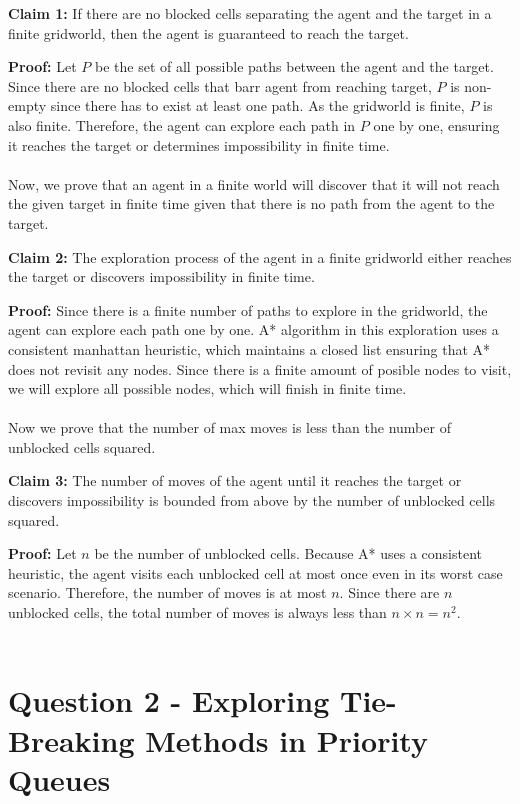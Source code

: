 \documentclass{article}
\begin{document}
\textbf{Claim 1:} If there are no blocked cells separating the agent and the target in a finite gridworld, then the agent is guaranteed to reach the target.

\textbf{Proof:} Let $P$ be the set of all possible paths between the agent and the target. Since there are no blocked cells that barr agent from reaching target, $P$ is non-empty since there has to exist at least one path. As the gridworld is finite, $P$ is also finite. Therefore, the agent can explore each path in $P$ one by one, ensuring it reaches the target or determines impossibility in finite time.
\\
\\
Now, we prove that an agent in a finite world will discover that it will not reach the given target in finite time given that there is no path from the agent to the target.

\textbf{Claim 2:} The exploration process of the agent in a finite gridworld either reaches the target or discovers impossibility in finite time.

\textbf{Proof:} Since there is a finite number of paths to explore in the gridworld, the agent can explore each path one by one. A* algorithm in this exploration uses a consistent manhattan heuristic, which maintains a closed list ensuring that A* does not revisit any nodes. Since there is a finite amount of posible nodes to visit, we will explore all possible nodes, which will finish in finite time.
\\
\\
Now we prove that the number of max moves is less than the number of unblocked cells squared. 

\textbf{Claim 3:} The number of moves of the agent until it reaches the target or discovers impossibility is bounded from above by the number of unblocked cells squared.

\textbf{Proof:} Let $n$ be the number of unblocked cells. Because A* uses a consistent heuristic, the agent visits each unblocked cell at most once even in its worst case scenario. Therefore, the number of moves is at most $n$. Since there are $n$ unblocked cells, the total number of moves is always less than $n \times n = n^2$. 
\\ 
\\

\section{Question 2 - Exploring Tie-Breaking Methods in Priority Queues}
\end{document}
